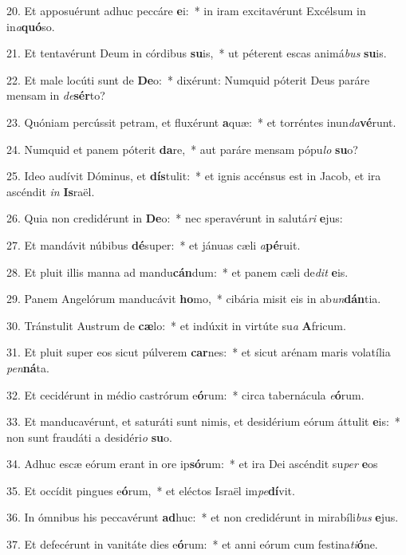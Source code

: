 20. Et apposuérunt adhuc peccáre \textbf{e}i:~*  in iram excitavérunt Excélsum in in\textit{a}\textbf{quó}so.\

21. Et tentavérunt Deum in córdibus \textbf{su}is,~*  ut péterent escas animá\textit{bus} \textbf{su}is.\

22. Et male locúti sunt de \textbf{De}o:~*  dixérunt: Numquid póterit Deus paráre mensam in \textit{de}\textbf{sér}to?\

23. Quóniam percússit petram, et fluxérunt \textbf{a}quæ:~*  et torréntes inun\textit{da}\textbf{vé}runt.\

24. Numquid et panem póterit \textbf{da}re,~*  aut paráre mensam pópu\textit{lo} \textbf{su}o?\

25. Ideo audívit Dóminus, et \textbf{dís}tulit:~*  et ignis accénsus est in Jacob, et ira ascéndit \textit{in} \textbf{Is}raël.\

26. Quia non credidérunt in \textbf{De}o:~*  nec speravérunt in salutá\textit{ri} \textbf{e}jus:\

27. Et mandávit núbibus \textbf{dé}super:~*  et jánuas cæli \textit{a}\textbf{pé}ruit.\

28. Et pluit illis manna ad mandu\textbf{cán}dum:~*  et panem cæli de\textit{dit} \textbf{e}is.\

29. Panem Angelórum manducávit \textbf{ho}mo,~*  cibária misit eis in ab\textit{un}\textbf{dán}tia.\

30. Tránstulit Austrum de \textbf{cæ}lo:~*  et indúxit in virtúte su\textit{a} \textbf{A}fricum.\

31. Et pluit super eos sicut púlverem \textbf{car}nes:~*  et sicut arénam maris volatília \textit{pen}\textbf{ná}ta.\

32. Et cecidérunt in médio castrórum e\textbf{ó}rum:~*  circa tabernácula \textit{e}\textbf{ó}rum.\

33. Et manducavérunt, et saturáti sunt nimis, et desidérium eórum áttulit \textbf{e}is:~*  non sunt fraudáti a desidéri\textit{o} \textbf{su}o.\

34. Adhuc escæ eórum erant in ore ip\textbf{só}rum:~*  et ira Dei ascéndit su\textit{per} \textbf{e}os\

35. Et occídit pingues e\textbf{ó}rum,~*  et eléctos Israël im\textit{pe}\textbf{dí}vit.\

36. In ómnibus his peccavérunt \textbf{ad}huc:~*  et non credidérunt in mirabíli\textit{bus} \textbf{e}jus.\

37. Et defecérunt in vanitáte dies e\textbf{ó}rum:~*  et anni eórum cum festina\textit{ti}\textbf{ó}ne.\


